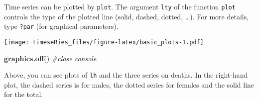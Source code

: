 \documentclass[]{book}
\newenvironment{Shaded}{\begin{snugshade}}{\end{snugshade}}
\newcommand{\KeywordTok}[1]{\textcolor[rgb]{0.13,0.29,0.53}{\textbf{#1}}}
\newcommand{\DataTypeTok}[1]{\textcolor[rgb]{0.13,0.29,0.53}{#1}}
\newcommand{\DecValTok}[1]{\textcolor[rgb]{0.00,0.00,0.81}{#1}}
\newcommand{\CharTok}[1]{\textcolor[rgb]{0.31,0.60,0.02}{#1}}
\newcommand{\StringTok}[1]{\textcolor[rgb]{0.31,0.60,0.02}{#1}}
\newcommand{\CommentTok}[1]{\textcolor[rgb]{0.56,0.35,0.01}{\textit{#1}}}
\newcommand{\NormalTok}[1]{#1}
\begin{document}
Time series can be plotted by \texttt{plot}. The argument \texttt{lty}
of the function \texttt{plot} controls the type of the plotted line
(solid, dashed, dotted, \ldots{}). For more details, type \texttt{?par}
(for graphical parameters).

\begin{Shaded}
\end{Shaded}

\texttt{[image: timeseRies\_files/figure-latex/basic\_plots-1.pdf]}

\begin{Shaded}
\begin{Highlighting}[]
\KeywordTok{graphics.off}\NormalTok{()  }\CommentTok{#close console}
\end{Highlighting}
\end{Shaded}

Above, you can see plots of \texttt{lh} and the three series on deaths.
In the right-hand plot, the dashed series is for males, the dotted
series for females and the solid line for the total.
\end{document}
